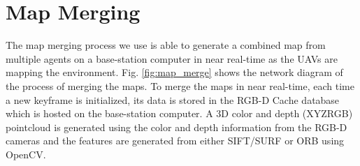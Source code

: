 \documentclass[letterpaper, 10 pt, conference]{ieeeconf}  %
\newcommand{\todo}[1]{{\color{blue}[TODO: #1]}}
\begin{document}
%
%
%
%

\section{Map Merging}\label{nav_merge}

The map merging process we use is able to generate a combined map from multiple agents on a base-station computer in near real-time as the UAVs are mapping the environment. Fig. \ref{fig:map_merge} shows the network diagram of the process of merging the maps. To merge the maps in near real-time, each time a new keyframe is initialized, its data is stored in the RGB-D Cache database which is hosted on the base-station computer. A 3D color and depth (XYZRGB) pointcloud is generated using the color and depth information from the RGB-D cameras and the features are generated from either SIFT/SURF or ORB using OpenCV.
\end{document}
